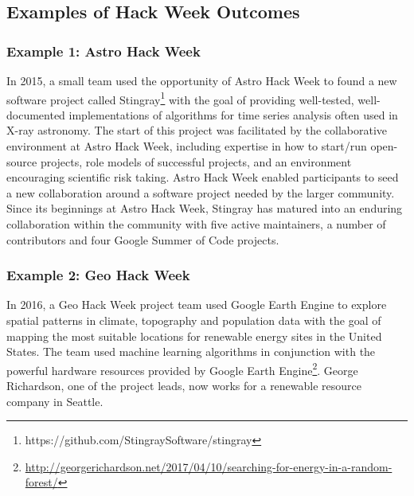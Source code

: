 \subsection*{Examples of Hack Week Outcomes}
\label{sec:outcomes}
\subsubsection*{Example 1: Astro Hack Week}
In 2015, a small team used the opportunity of Astro Hack Week to found a new software project called Stingray\footnote{https://github.com/StingraySoftware/stingray} with the goal of providing well-tested, well-documented implementations of algorithms for time series analysis often used in X-ray astronomy.
The start of this project was facilitated by the collaborative environment at Astro Hack Week, including expertise in how to start/run open-source projects, role models of successful projects, and an environment encouraging scientific risk taking. Astro Hack Week enabled participants to seed a new collaboration around a software project needed by the larger community.
Since its beginnings at Astro Hack Week, Stingray has matured into an enduring collaboration within the community with five active maintainers, a number of contributors and four Google Summer of Code projects.
\subsubsection*{Example 2: Geo Hack Week}
In 2016, a Geo Hack Week project team used Google Earth Engine to explore spatial patterns in climate, topography and population data with the goal of mapping the most suitable locations for renewable energy sites in the United States.
The team used machine learning algorithms in conjunction with the powerful hardware resources provided by Google Earth Engine\footnote{\url{http://georgerichardson.net/2017/04/10/searching-for-energy-in-a-random-forest/}}.
George Richardson, one of the project leads, now works for a renewable resource company in Seattle.
